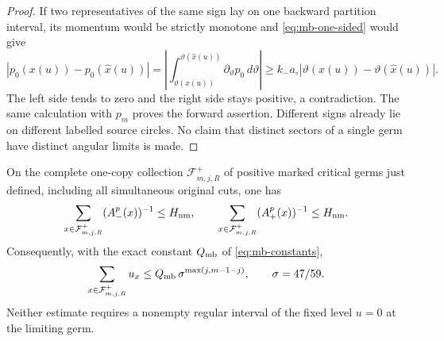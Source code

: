 \begin{proof}
If two representatives of the same sign lay on one backward
partition interval, its momentum would be strictly monotone and
\eqref{eq:mb-one-sided} would give
\[
 |p_0(x(u))-p_0(\widehat x(u))|
   =\left|\int_{\vartheta(x(u))}^{\vartheta(\widehat x(u))}
                       \partial_\vartheta p_0\,d\vartheta\right|
   \ge k_-a_\circ
           |\vartheta(x(u))-\vartheta(\widehat x(u))|.
\]
The left side tends to zero and the right side stays positive,
a contradiction.  The same calculation with $p_m$ proves the
forward assertion.  Different signs already lie on different
labelled source circles.  No claim that distinct sectors of a
single germ have distinct angular limits is made.
\end{proof}

\begin{theorem}
\label{thm:pf-half-sum}
On the complete one-copy collection $\mathcal F^+_{m,j,R}$ of
positive marked critical germs just defined, including all
simultaneous original cuts, one has
\begin{equation}\label{eq:pf-half-sum}
 \sum_{x\in\mathcal F^+_{m,j,R}}(A_-^p(x))^{-1}\le H_{\rm nm},
 \qquad
 \sum_{x\in\mathcal F^+_{m,j,R}}(A_+^p(x))^{-1}\le H_{\rm nm}.
\end{equation}
Consequently, with the exact constant $Q_{\rm mb}$ of
\eqref{eq:mb-constants},
\begin{equation}\label{eq:pf-root-sum}
 \sum_{x\in\mathcal F^+_{m,j,R}}u_x
       \le Q_{\rm mb}\,\sigma^{\max(j,m-1-j)},
              \qquad \sigma=47/59.
\end{equation}
Neither estimate requires a nonempty regular interval of the
fixed level $u=0$ at the limiting germ.
\end{theorem}
